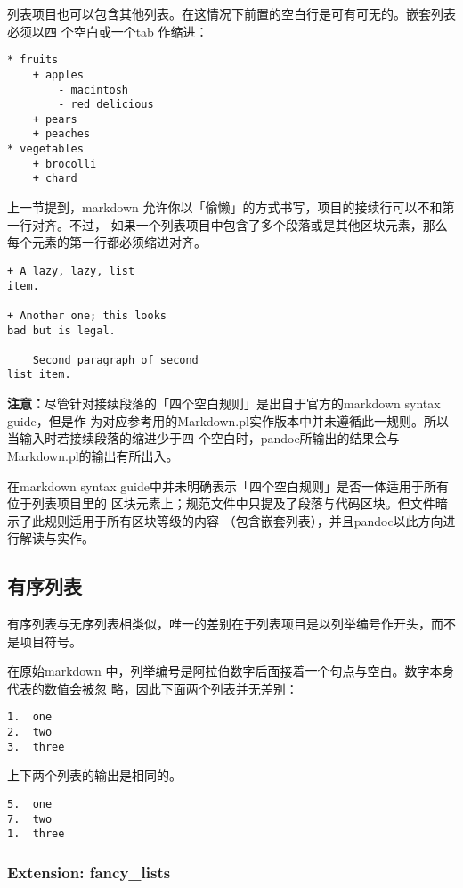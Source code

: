 \documentclass[cn]{elegantbook}
\begin{document}
列表项目也可以包含其他列表。在这情况下前置的空白行是可有可无的。嵌套列表必须以四
个空白或一个tab 作缩进：

\begin{lstlisting}
* fruits
    + apples
        - macintosh
        - red delicious
    + pears
    + peaches
* vegetables
    + brocolli
    + chard
\end{lstlisting}

上一节提到，markdown
允许你以「偷懒」的方式书写，项目的接续行可以不和第一行对齐。不过，
如果一个列表项目中包含了多个段落或是其他区块元素，那么每个元素的第一行都必须缩进对齐。

\begin{lstlisting}
+ A lazy, lazy, list
item.

+ Another one; this looks
bad but is legal.

    Second paragraph of second
list item.
\end{lstlisting}

\textbf{注意：}尽管针对接续段落的「四个空白规则」是出自于官方的markdown
syntax guide，但是作
为对应参考用的Markdown.pl实作版本中并未遵循此一规则。所以当输入时若接续段落的缩进少于四
个空白时，pandoc所输出的结果会与Markdown.pl的输出有所出入。

在markdown syntax
guide中并未明确表示「四个空白规则」是否一体适用于所有位于列表项目里的
区块元素上；规范文件中只提及了段落与代码区块。但文件暗示了此规则适用于所有区块等级的内容
（包含嵌套列表），并且pandoc以此方向进行解读与实作。

\hypertarget{ux6709ux5e8fux5217ux8868}{%
\subsection{有序列表}\label{ux6709ux5e8fux5217ux8868}}

有序列表与无序列表相类似，唯一的差别在于列表项目是以列举编号作开头，而不是项目符号。

在原始markdown
中，列举编号是阿拉伯数字后面接着一个句点与空白。数字本身代表的数值会被忽
略，因此下面两个列表并无差别：

\begin{lstlisting}
1.  one
2.  two
3.  three
\end{lstlisting}

上下两个列表的输出是相同的。

\begin{lstlisting}
5.  one
7.  two
1.  three
\end{lstlisting}

\hypertarget{extension-fancy_lists}{%
\subsubsection{Extension: fancy\_lists}\label{extension-fancy_lists}}
\end{document}
